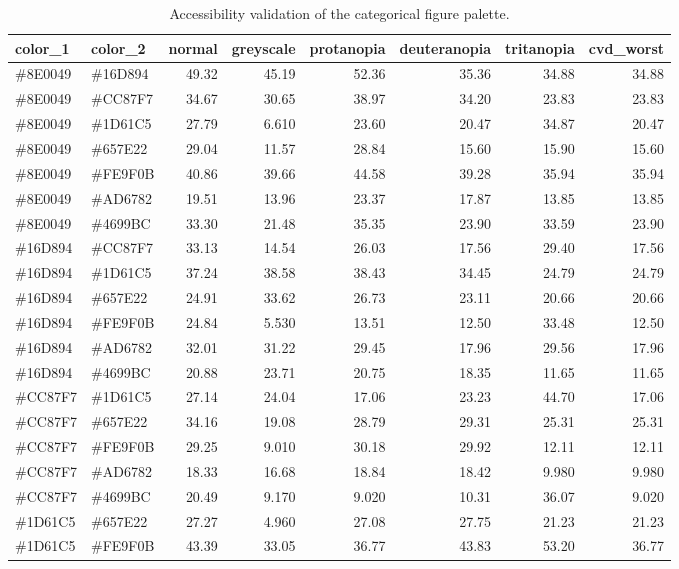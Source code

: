 \begin{table}[!t]
\centering
\caption{Accessibility validation of the categorical figure palette.}
\label{tab:figure_palette_validation}
\footnotesize
\begin{tabular}{llrrrrrr}
\toprule
color\_1 & color\_2 & normal & greyscale & protanopia & deuteranopia & tritanopia & cvd\_worst \\
\midrule
\#8E0049 & \#16D894 & 49.32 & 45.19 & 52.36 & 35.36 & 34.88 & 34.88 \\
\#8E0049 & \#CC87F7 & 34.67 & 30.65 & 38.97 & 34.20 & 23.83 & 23.83 \\
\#8E0049 & \#1D61C5 & 27.79 & 6.610 & 23.60 & 20.47 & 34.87 & 20.47 \\
\#8E0049 & \#657E22 & 29.04 & 11.57 & 28.84 & 15.60 & 15.90 & 15.60 \\
\#8E0049 & \#FE9F0B & 40.86 & 39.66 & 44.58 & 39.28 & 35.94 & 35.94 \\
\#8E0049 & \#AD6782 & 19.51 & 13.96 & 23.37 & 17.87 & 13.85 & 13.85 \\
\#8E0049 & \#4699BC & 33.30 & 21.48 & 35.35 & 23.90 & 33.59 & 23.90 \\
\#16D894 & \#CC87F7 & 33.13 & 14.54 & 26.03 & 17.56 & 29.40 & 17.56 \\
\#16D894 & \#1D61C5 & 37.24 & 38.58 & 38.43 & 34.45 & 24.79 & 24.79 \\
\#16D894 & \#657E22 & 24.91 & 33.62 & 26.73 & 23.11 & 20.66 & 20.66 \\
\#16D894 & \#FE9F0B & 24.84 & 5.530 & 13.51 & 12.50 & 33.48 & 12.50 \\
\#16D894 & \#AD6782 & 32.01 & 31.22 & 29.45 & 17.96 & 29.56 & 17.96 \\
\#16D894 & \#4699BC & 20.88 & 23.71 & 20.75 & 18.35 & 11.65 & 11.65 \\
\#CC87F7 & \#1D61C5 & 27.14 & 24.04 & 17.06 & 23.23 & 44.70 & 17.06 \\
\#CC87F7 & \#657E22 & 34.16 & 19.08 & 28.79 & 29.31 & 25.31 & 25.31 \\
\#CC87F7 & \#FE9F0B & 29.25 & 9.010 & 30.18 & 29.92 & 12.11 & 12.11 \\
\#CC87F7 & \#AD6782 & 18.33 & 16.68 & 18.84 & 18.42 & 9.980 & 9.980 \\
\#CC87F7 & \#4699BC & 20.49 & 9.170 & 9.020 & 10.31 & 36.07 & 9.020 \\
\#1D61C5 & \#657E22 & 27.27 & 4.960 & 27.08 & 27.75 & 21.23 & 21.23 \\
\#1D61C5 & \#FE9F0B & 43.39 & 33.05 & 36.77 & 43.83 & 53.20 & 36.77 \\

\end{tabular}
\end{table}
